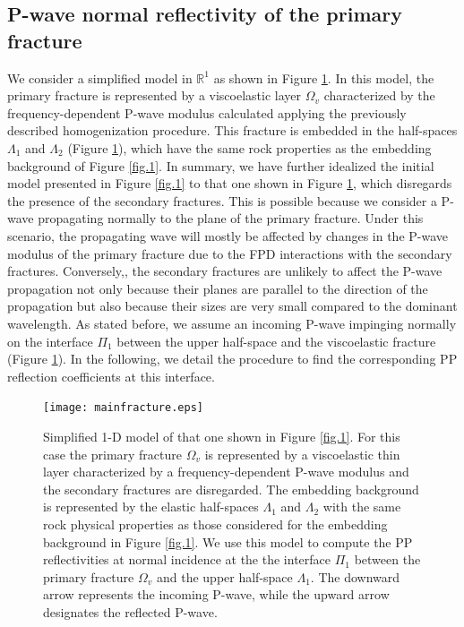 \documentclass[draft]{agujournal2019}
\begin{document}
\subsection{P-wave normal reflectivity of the primary fracture}
We consider a simplified  model in $\mathbb R^1$ as shown in Figure \ref{fig.3}. In this model, the primary fracture is represented by a viscoelastic layer $\Omega_v$ characterized by the frequency-dependent P-wave modulus calculated applying the previously described homogenization procedure. This fracture is embedded in the half-spaces $\Lambda_1$ and $\Lambda_2$ (Figure \ref{fig.3}), which have the same rock properties as the embedding background of Figure \ref{fig.1}. In summary, we have further idealized the initial model presented in Figure \ref{fig.1} to that one shown in  Figure \ref{fig.3}, which disregards the presence of the secondary fractures. This is possible because we consider a P-wave propagating normally to the plane of the primary fracture. Under this scenario, the propagating wave will mostly be affected by changes in the P-wave modulus of the primary fracture due to the FPD interactions with the secondary fractures. Conversely,, the secondary fractures are unlikely to affect the P-wave propagation not only because their planes are parallel to the direction of the propagation but also because their sizes are very small compared to the dominant wavelength. As stated before, we  assume an incoming P-wave impinging normally on the interface $\Pi_1$ between the upper half-space and the viscoelastic fracture (Figure \ref{fig.3}). In the following, we detail the procedure to find the corresponding PP reflection coefficients at this interface.

 \begin{figure}[!ht]
\centering
        \texttt{[image: mainfracture.eps]}
\caption{ Simplified 1-D model of that one shown in Figure \ref{fig.1}. For this case the primary fracture $\Omega_v$ is represented by a viscoelastic thin layer characterized by a frequency-dependent P-wave modulus and the secondary fractures are disregarded. The embedding background is represented by the  elastic half-spaces $\Lambda_1$ and $\Lambda_2$ with the same rock physical properties as those considered for the embedding background in Figure \ref{fig.1}. We 
use this model to compute the PP reflectivities at normal incidence at the the interface $\Pi_1$ between the primary fracture $\Omega_v$ and the upper half-space $\Lambda_1$. The downward arrow represents the incoming P-wave, while the upward arrow designates the reflected P-wave.
}
\label{fig.3}
\end{figure}
\end{document}

